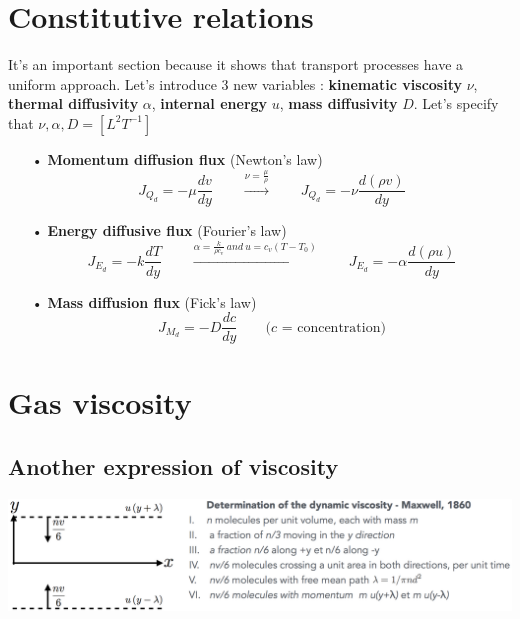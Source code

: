 \section{Constitutive relations}
It's an important section because it shows that transport processes have a uniform approach. Let's introduce 3 new variables : \textbf{kinematic viscosity} $\nu$, \textbf{thermal diffusivity }$\alpha$, \textbf{internal energy} $u$, \textbf{mass diffusivity} $D$. Let's specify that $\nu , \alpha , D = [L^2T^{-1}]$\\
\begin{itemize}
	\item[•] \textbf{Momentum diffusion flux} (Newton's law)
	      \begin{equation}
	      	J_{Q_d}=-\mu \frac{dv}{dy} \qquad \xrightarrow {\nu = \frac{\mu}{\rho}} \qquad J_{Q_d}=-\nu \frac{d(\rho v)}{dy}
	      	\label{equation:1.11}
	      \end{equation}
	      		
	\item[•] \textbf{Energy diffusive flux} (Fourier's law)
	      \begin{equation}
	      	J_{E_d} = -k\frac{dT}{dy} \qquad \xrightarrow{\alpha = \frac{k}{\rho c_v} \ and \ u = c_v(T-T_0)} \qquad J_{E_d} = -\alpha\frac{d(\rho u)}{dy}
	      \end{equation}
	      		
	\item[•] \textbf{Mass diffusion flux} (Fick's law)
	      \begin{equation}
	      	J_{M_d} = -D \frac{dc}{dy} \qquad \mbox{($c$ = concentration)}
	      \end{equation}
\end{itemize}
	\newpage
\section{Gas viscosity}
\subsection{Another expression of viscosity}
\begin{center}
	\includegraphics[scale=0.45]{ch1/8}
\end{center}
	
